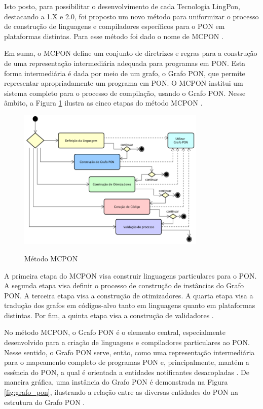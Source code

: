 Isto posto, para possibilitar o desenvolvimento de cada Tecnologia LingPon,
destacando a 1.X e 2.0, foi proposto um novo método para uniformizar o processo
de construção de linguagens e compiladores específicos para o PON em plataformas
distintas. Para esse método foi dado o nome de MCPON \cite{doc_ronszcka_2019}.

Em suma, o MCPON define um conjunto de diretrizes e regras para a construção de
uma representação intermediária adequada para programas em PON. Esta forma
intermediária é dada por meio de um grafo, o Grafo PON, que permite representar
apropriadamente um programa em PON. O MCPON institui um sistema completo para o
processo de compilação, usando o Grafo PON. Nesse âmbito, a Figura
\ref{fig:mcpon} ilustra as cinco etapas do método MCPON
\cite{doc_ronszcka_2019}.

\begin{figure}[!htb]
  \centering
  \caption{Método MCPON}
  \includegraphics[width=0.8\textwidth]{../figures/metodo_mcpon.png}
  \smallskip
  \label{fig:mcpon}
\end{figure}

A primeira etapa do MCPON visa construir linguagens particulares para o PON. A
segunda etapa visa definir o processo de construção de instâncias do Grafo PON.
A terceira etapa visa a construção de otimizadores. A quarta etapa visa a
tradução dos grafos em códigos-alvo tanto em linguagens quanto em plataformas
distintas. Por fim, a quinta etapa visa a construção de validadores
\cite{doc_ronszcka_2019}.

No método MCPON, o Grafo PON é o elemento central, especialmente desenvolvido
para a criação de linguagens e compiladores particulares ao PON. Nesse sentido,
o Grafo PON serve, então, como uma representação intermediária para o mapeamento
completo de programas PON e, principalmente, mantém a essência do PON, a qual é
orientada a entidades notificantes desacopladas \cite{doc_ronszcka_2019}. De
maneira gráfica, uma instância do Grafo PON é demonstrada na Figura
\ref{fig:grafo_pon}, ilustrando a relação entre as diversas entidades do PON
na estrutura do Grafo PON \cite{msc_negrini_2019}.

